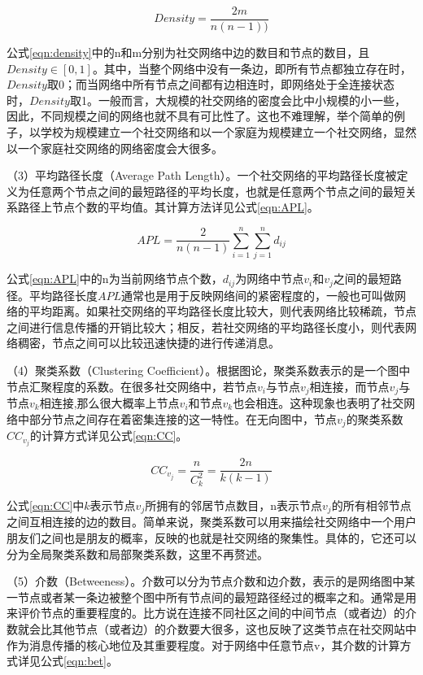 \begin{equation}
  \label{eqn:density}
  Density=\frac{2m}{n(n-1))} 
\end{equation}

公式\ref{eqn:density}中的n和m分别为社交网络中边的数目和节点的数目，且$Density\in [0,1]$。其中，当整个网络中没有一条边，即所有节点都独立存在时，$Density$取0；而当网络中所有节点之间都有边相连时，即网络处于全连接状态时，$Density$取1。一般而言，大规模的社交网络的密度会比中小规模的小一些，因此，不同规模之间的网络也就不具有可比性了。这也不难理解，举个简单的例子，以学校为规模建立一个社交网络和以一个家庭为规模建立一个社交网络，显然以一个家庭社交网络的网络密度会大很多。

（3）平均路径长度（Average Path Length）。一个社交网络的平均路径长度被定义为任意两个节点之间的最短路径的平均长度，也就是任意两个节点之间的最短关系路径上节点个数的平均值。其计算方法详见公式\ref{eqn:APL}。

\begin{equation}
  \label{eqn:APL}
  APL=\frac{2}{n(n-1)}\sum _{i=1}^{n}\sum_{j=1}^{n}d_{ij}
\end{equation}

公式\ref{eqn:APL}中的n为当前网络节点个数，$d_{ij}$为网络中节点$v_i$和$v_j$之间的最短路径。平均路径长度$APL$通常也是用于反映网络间的紧密程度的，一般也可叫做网络的平均距离。如果社交网络的平均路径长度比较大，则代表网络比较稀疏，节点之间进行信息传播的开销比较大；相反，若社交网络的平均路径长度小，则代表网络稠密，节点之间可以比较迅速快捷的进行传递消息。

（4）聚类系数（Clustering Coefficient）。根据图论，聚类系数表示的是一个图中节点汇聚程度的系数。在很多社交网络中，若节点$v_i$与节点$v_j$相连接，而节点$v_j$与节点$v_k$相连接,那么很大概率上节点$v_i$和节点$v_k$也会相连。这种现象也表明了社交网络中部分节点之间存在着密集连接的这一特性。在无向图中，节点$v_j$的聚类系数$CC_{v_j}$的计算方式详见公式\ref{eqn:CC}。

\begin{equation}
  \label{eqn:CC}
  CC_{v_j}=\frac{n}{C_k^2}=\frac{2n}{k(k-1)}
\end{equation}

公式\ref{eqn:CC}中$k$表示节点$v_j$所拥有的邻居节点数目，n表示节点$v_j$的所有相邻节点之间互相连接的边的数目。简单来说，聚类系数可以用来描绘社交网络中一个用户朋友们之间也是朋友的概率，反映的也就是社交网络的聚集性。具体的，它还可以分为全局聚类系数和局部聚类系数，这里不再赘述。

（5）介数（Betweeness）。介数可以分为节点介数和边介数，表示的是网络图中某一节点或者某一条边被整个图中所有节点间的最短路径经过的概率之和。通常是用来评价节点的重要程度的。比方说在连接不同社区之间的中间节点（或者边）的介数就会比其他节点（或者边）的介数要大很多，这也反映了这类节点在社交网站中作为消息传播的核心地位及其重要程度。对于网络中任意节点v，其介数的计算方式详见公式\ref{eqn:bet}。

